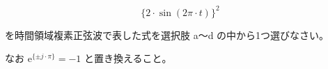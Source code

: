 \[
\{2 \cdot \sin (2\pi\cdot t) \}^2
\]

\bigskip
\noindent を時間領域複素正弦波で表した式を選択肢 a〜d の中から1つ選びなさい。

\noindent なお $\textrm{e}^{\{ \pm j \cdot \pi \}} = -1$ と置き換えること。
